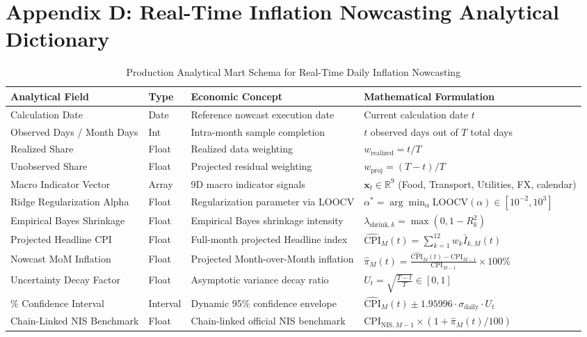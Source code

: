\section*{Appendix D: Real-Time Inflation Nowcasting Analytical Dictionary}

\begin{table}[H]
\centering
\small
\setlength{\tabcolsep}{4pt}
\begin{tabularx}{\textwidth}{|>{\raggedright\arraybackslash}p{3.8cm}|>{\centering\arraybackslash}p{1.4cm}|>{\raggedright\arraybackslash}X|>{\raggedright\arraybackslash}X|}
\hline
\rowcolor{blue!20}
\textbf{Analytical Field} & \textbf{Type} & \textbf{Economic Concept} & \textbf{Mathematical Formulation} \\ \hline
Calculation Date & Date & Reference nowcast execution date & Current calculation date $t$ \\ \hline
Observed Days / Month Days & Int & Intra-month sample completion & $t$ observed days out of $T$ total days \\ \hline
Realized Share & Float & Realized data weighting & $w_{\text{realized}} = t / T$ \\ \hline
Unobserved Share & Float & Projected residual weighting & $w_{\text{proj}} = (T - t) / T$ \\ \hline
Macro Indicator Vector & Array & 9D macro indicator signals & $\mathbf{x}_t \in \mathbb{R}^9$ (Food, Transport, Utilities, FX, calendar) \\ \hline
Ridge Regularization Alpha & Float & Regularization parameter via LOOCV & $\alpha^* = \arg\min_\alpha \text{LOOCV}(\alpha) \in [10^{-2}, 10^3]$ \\ \hline
Empirical Bayes Shrinkage & Float & Empirical Bayes shrinkage intensity & $\lambda_{\text{shrink}, k} = \max(0, 1 - R_k^2)$ \\ \hline
Projected Headline CPI & Float & Full-month projected Headline index & $\widehat{\text{CPI}}_M(t) = \sum_{k=1}^{12} w_k \bar{I}_{k, M}(t)$ \\ \hline
Nowcast MoM Inflation & Float & Projected Month-over-Month inflation & $\widehat{\pi}_M(t) = \frac{\widehat{\text{CPI}}_M(t) - \text{CPI}_{M-1}}{\text{CPI}_{M-1}} \times 100\%$ \\ \hline
Uncertainty Decay Factor & Float & Asymptotic variance decay ratio & $U_t = \sqrt{\frac{T - t}{T}} \in [0, 1]$ \\ \hline
95\% Confidence Interval & Interval & Dynamic 95\% confidence envelope & $\widehat{\text{CPI}}_M(t) \pm 1.95996 \cdot \sigma_{\text{daily}} \cdot U_t$ \\ \hline
Chain-Linked NIS Benchmark & Float & Chain-linked official NIS benchmark & $\text{CPI}_{\text{NIS}, M-1} \times (1 + \widehat{\pi}_M(t)/100)$ \\ \hline
\end{tabularx}
\caption{Production Analytical Mart Schema for Real-Time Daily Inflation Nowcasting}
\label{tab:appendix_nowcast_store}
\end{table}

